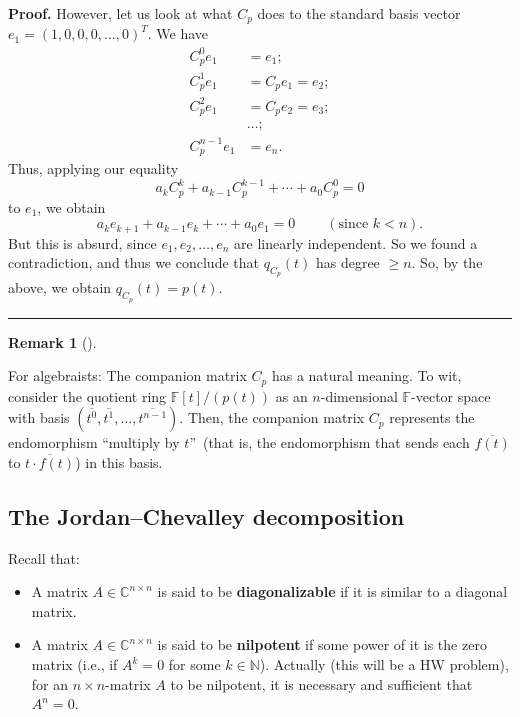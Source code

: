 \documentclass[numbers=enddot,12pt,final,onecolumn,notitlepage]{scrartcl}%
\numberwithin{exer}{subsection}
\theoremstyle{definition}
\newtheorem{remk}[theo]{Remark}
\newenvironment{remark}[1][]
{\begin{remk}[#1]\begin{leftbar}}
{\end{leftbar}\end{remk}}
\newenvironment{proof}[1][Proof]{\noindent\textbf{#1.} }{\ \rule{0.5em}{0.5em}}
\begin{document}
\begin{proof}
However, let us look at what $C_{p}$ does to the standard basis vector
$e_{1}=\left(  1,0,0,0,\ldots,0\right)  ^{T}$. We have%
\begin{align*}
C_{p}^{0}e_{1}  & =e_{1};\\
C_{p}^{1}e_{1}  & =C_{p}e_{1}=e_{2};\\
C_{p}^{2}e_{1}  & =C_{p}e_{2}=e_{3};\\
& \ldots;\\
C_{p}^{n-1}e_{1}  & =e_{n}.
\end{align*}
Thus, applying our equality%
\[
a_{k}C_{p}^{k}+a_{k-1}C_{p}^{k-1}+\cdots+a_{0}C_{p}^{0}=0
\]
to $e_{1}$, we obtain%
\[
a_{k}e_{k+1}+a_{k-1}e_{k}+\cdots+a_{0}e_{1}=0\ \ \ \ \ \ \ \ \ \ \left(
\text{since }k<n\right)  .
\]
But this is absurd, since $e_{1},e_{2},\ldots,e_{n}$ are linearly independent.
So we found a contradiction, and thus we conclude that $q_{C_{p}}\left(
t\right)  $ has degree $\geq n$. So, by the above, we obtain $q_{C_{p}}\left(
t\right)  =p\left(  t\right)  $.
\end{proof}

\begin{remark}
For algebraists: The companion matrix $C_{p}$ has a natural meaning. To wit,
consider the quotient ring $\mathbb{F}\left[  t\right]  /\left(  p\left(
t\right)  \right)  $ as an $n$-dimensional $\mathbb{F}$-vector space with
basis $\left(  \overline{t^{0}},\overline{t^{1}},\ldots,\overline{t^{n-1}%
}\right)  $. Then, the companion matrix $C_{p}$ represents the endomorphism
\textquotedblleft multiply by $t$\textquotedblright\ (that is, the
endomorphism that sends each $\overline{f\left(  t\right)  }$ to
$\overline{t\cdot f\left(  t\right)  }$) in this basis.
\end{remark}

\subsection{The Jordan--Chevalley decomposition}

Recall that:

\begin{itemize}
\item A matrix $A\in\mathbb{C}^{n\times n}$ is said to be
\textbf{diagonalizable} if it is similar to a diagonal matrix.

\item A matrix $A\in\mathbb{C}^{n\times n}$ is said to be \textbf{nilpotent}
if some power of it is the zero matrix (i.e., if $A^{k}=0$ for some
$k\in\mathbb{N}$). Actually (this will be a HW problem), for an $n\times
n$-matrix $A$ to be nilpotent, it is necessary and sufficient that $A^{n}=0$.
\end{itemize}
\end{document}

